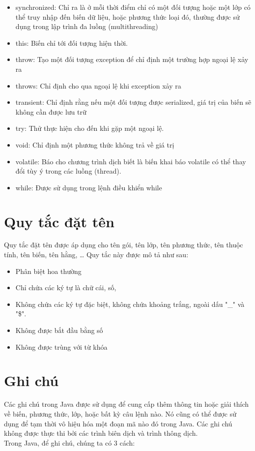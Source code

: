 \begin{itemize}
\item
synchronized: Chỉ ra là ở mỗi thời điểm chỉ có một đối tượng hoặc một lớp có thể truy nhập đến biến dữ liệu, hoặc phương thức loại đó, thường được sử dụng trong lập trình đa luồng (multithreading) 
\item
this: Biến chỉ tới đối tượng hiện thời. 
\item
throw: Tạo một đối tượng exception để chỉ định một trường hợp ngoại lệ xảy ra 
\item
throws: Chỉ định cho qua ngoại lệ khi exception xảy ra 
\item
transient: Chỉ định rằng nếu một đối tượng được serialized, giá trị của biến sẽ không cần được lưu trữ 
\item
try: Thử thực hiện cho đến khi gặp một ngoại lệ. 
\item
void: Chỉ định một phương thức không trả về giá trị 
\item
volatile: Báo cho chương trình dịch biết là biến khai báo volatile có thể thay đổi tùy ý trong các luồng (thread). 
\item
while: Được sử dụng trong lệnh điều khiển while 
\end{itemize}


\section{Quy tắc đặt tên}
\indent Quy tắc đặt tên được áp dụng cho tên gói, tên lớp, tên phương thức, tên thuộc tính, tên biến, tên hằng, … Quy tắc này được mô tả như sau:\\
\begin{itemize}
\item Phân biệt hoa thường
\item Chỉ chứa các ký tự là chữ cái, số, 
\item Không chứa các ký tự đặc biệt, không chứa khoảng trắng, ngoài dấu "\_" và "\$".
\item Không được bắt đầu bằng số
\item Không được trùng với từ khóa
\end{itemize}
\section{Ghi chú}
\indent Các ghi chú trong Java được sử dụng để cung cấp thêm thông tin hoặc giải thích về biến, phương thức, lớp, hoặc bất kỳ câu lệnh nào. Nó cũng có thể được sử dụng để tạm thời vô hiệu hóa một đoạn mã nào đó trong Java. Các ghi chú không được thực thi bởi các trình biên dịch và trình thông dịch.\\
\indent Trong Java, để ghi chú, chúng ta có 3 cách:
